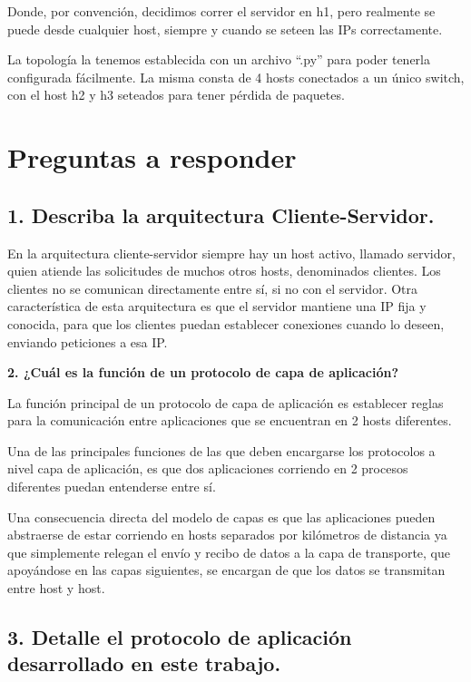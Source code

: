 \documentclass{article}
\begin{document}
Donde, por convención, decidimos correr el servidor en h1, pero realmente se puede desde cualquier host, siempre y cuando se seteen las IPs correctamente.

La topología la tenemos establecida con un archivo ``.py'' para poder tenerla configurada fácilmente. La misma consta de 4 hosts conectados a un único switch, con el host h2 y h3 seteados para tener pérdida de
paquetes.

\section{\texorpdfstring{\textbf{Preguntas a responder}}{Preguntas a responder}}\label{preguntas-a-responder}

\subsection{\texorpdfstring{\textbf{1. Describa la arquitectura Cliente-Servidor.}}{1. Describa la arquitectura Cliente-Servidor.}}\label{describa-la-arquitectura-cliente-servidor.}

En la arquitectura cliente-servidor siempre hay un host activo, llamado servidor, quien atiende las solicitudes de muchos otros hosts, denominados clientes. Los clientes no se comunican directamente entre sí, si no con el servidor. Otra característica de esta arquitectura es que el servidor mantiene una IP fija y conocida, para que los clientes puedan establecer conexiones cuando lo deseen, enviando peticiones a esa IP.

\textbf{2. ¿Cuál es la función de un protocolo de capa de aplicación?}

La función principal de un protocolo de capa de aplicación es establecer reglas para la comunicación entre aplicaciones que se encuentran en 2 hosts diferentes.

Una de las principales funciones de las que deben encargarse los protocolos a nivel capa de aplicación, es que dos aplicaciones corriendo en 2 procesos diferentes puedan entenderse entre sí.

Una consecuencia directa del modelo de capas es que las aplicaciones pueden abstraerse de estar corriendo en hosts separados por kilómetros de distancia ya que simplemente relegan el envío y recibo de datos a la capa de transporte, que apoyándose en las capas siguientes, se encargan de que los datos se transmitan entre host y host.

\subsection{\texorpdfstring{\textbf{3. Detalle el protocolo de
aplicación desarrollado en este trabajo.}}{3. Detalle el protocolo de aplicación desarrollado en este trabajo.}}\label{detalle-el-protocolo-de-aplicaciuxf3n-desarrollado-en-este-trabajo.}
\end{document}
